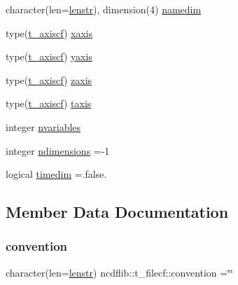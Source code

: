 \begin{DoxyCompactItemize}
\item 
character(len=\mbox{\hyperlink{namespacencdflib_a7d52315e1d9f473093f6f8fa245ea084}{lenstr}}), dimension(4) \mbox{\hyperlink{structncdflib_1_1t__filecf_a0840671c1e25821d4db862ead8f321e3}{namedim}}
\item 
type(\mbox{\hyperlink{structncdflib_1_1t__axiscf}{t\+\_\+axiscf}}) \mbox{\hyperlink{structncdflib_1_1t__filecf_a836914f9ad3e9198889813129bffe662}{xaxis}}
\item 
type(\mbox{\hyperlink{structncdflib_1_1t__axiscf}{t\+\_\+axiscf}}) \mbox{\hyperlink{structncdflib_1_1t__filecf_ab0708f25ee5b04fe1d14a0aae71ad815}{yaxis}}
\item 
type(\mbox{\hyperlink{structncdflib_1_1t__axiscf}{t\+\_\+axiscf}}) \mbox{\hyperlink{structncdflib_1_1t__filecf_a2f57171048a67946d2eb207750c27780}{zaxis}}
\item 
type(\mbox{\hyperlink{structncdflib_1_1t__axiscf}{t\+\_\+axiscf}}) \mbox{\hyperlink{structncdflib_1_1t__filecf_a86f950dba787e45de0c35496445e6db1}{taxis}}
\item 
integer \mbox{\hyperlink{structncdflib_1_1t__filecf_a7430b2f6135d758218e82e522220ff60}{nvariables}}
\item 
integer \mbox{\hyperlink{structncdflib_1_1t__filecf_a8bb08604242109723c5be6d84da4b17a}{ndimensions}} =-\/1
\item 
logical \mbox{\hyperlink{structncdflib_1_1t__filecf_a3c9380039f2f0d89b26da608d0ae2f89}{timedim}} =.false.
\end{DoxyCompactItemize}


\subsection{Member Data Documentation}
\mbox{\label{structncdflib_1_1t__filecf_af08cdad41c524e1218ab9dd3a7f4c70c}} 
\subsubsection{\texorpdfstring{convention}{convention}}
{\footnotesize\ttfamily character(len=\mbox{\hyperlink{namespacencdflib_a7d52315e1d9f473093f6f8fa245ea084}{lenstr}}) ncdflib\+::t\+\_\+filecf\+::convention =\char`\"{}\char`\"{}\hspace{0.3cm}{\ttfamily [private]}}


